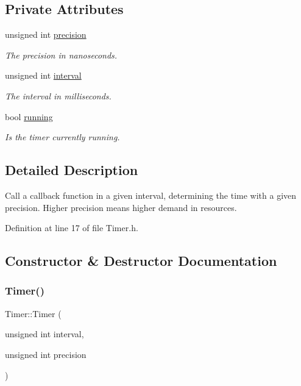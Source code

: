 \subsection*{Private Attributes}
\begin{DoxyCompactItemize}
\item 
unsigned int \hyperlink{class_timer_a3d1026dd88596a97cb6b768f475ed57f}{precision}
\begin{DoxyCompactList}\small\item\em The precision in nanoseconds. \end{DoxyCompactList}\item 
unsigned int \hyperlink{class_timer_aaf9bce1286b714658a0f4484d8fee960}{interval}
\begin{DoxyCompactList}\small\item\em The interval in milliseconds. \end{DoxyCompactList}\item 
bool \hyperlink{class_timer_a3b8bb57a0a252c88f85c0592715ea425}{running}
\begin{DoxyCompactList}\small\item\em Is the timer currently running. \end{DoxyCompactList}\end{DoxyCompactItemize}


\subsection{Detailed Description}
Call a callback function in a given interval, determining the time with a given precision. Higher precision means higher demand in resources. 

Definition at line 17 of file Timer.\+h.



\subsection{Constructor \& Destructor Documentation}
\mbox{\label{class_timer_a5b659c4fb572c549dad183a7b32b08df}} 
\subsubsection{\texorpdfstring{Timer()}{Timer()}}
{\footnotesize\ttfamily Timer\+::\+Timer (\begin{DoxyParamCaption}\item[{unsigned int}]{interval,  }\item[{unsigned int}]{precision }\end{DoxyParamCaption})}

